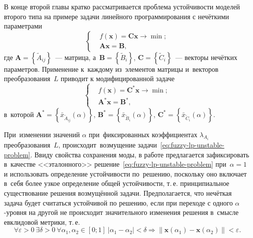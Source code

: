 В конце второй главы кратко рассматривается проблема устойчивости моделей второго типа на примере задачи линейного программирования с нечёткими параметрами
\begin{equation*}
  \left\{ \begin{aligned}
    & f\left( \mathbf{x} \right)=\mathbf{Cx}\to \min;  \\ 
    & \mathbf{Ax}=\mathbf{B},
  \end{aligned} \right.
\end{equation*}
где $\mathbf{A}=\left\{ \tilde{A}_{ij} \right\}$~--- матрица, а~$\mathbf{B}=\left\{ \tilde{B}_i \right\}$, $\mathbf{C}=\left\{\tilde{C}_i \right\}$~--- векторы нечётких параметров. 
Применение к~каждому из~элементов матрицы и~векторов преобразования~$L$ приводит к модифицированной задаче
\begin{equation}
\label{eq:fuzzy-lp-unstable-problem}
  \left\{ \begin{aligned}
    & f\left( \mathbf{x} \right)={\mathbf{C}^{*}}\mathbf{x}\to \min;  \\ 
    & {\mathbf{A}^{*}}\mathbf{x}={\mathbf{B}}^{*},
  \end{aligned} \right.
\end{equation}
в~которой $\mathbf{A}^{*}=\left\{ \bar{x}_{\tilde{A}_{ij}}\left(\alpha \right) \right\}$, $\mathbf{B}^{*}=\left\{ \bar{x}_{\tilde{B}_i}\left(\alpha \right) \right\}$, $\mathbf{C}^{*}=\left\{ \bar{x}_{\tilde{C}_i}\left(\alpha \right) \right\}$.

При~изменении значений $\alpha$ при~фиксированных коэффициентах $\lambda_{A_i}$ преобразования~$L$, происходит~возмущение задачи~\eqref{eq:fuzzy-lp-unstable-problem}. Ввиду свойства сохранения моды, в работе предлагается зафиксировать в~качестве <<эталонного>> решение~\eqref{eq:fuzzy-lp-unstable-problem} при~$\alpha=1$ и использовать определение устойчивости по~решению, поскольку оно включает в~себя более узкое определение общей устойчивости, т.\,е. принципиальное существование решения возмущённой задачи. Предполагается, что нечёткая задача будет считаться устойчивой по решению, если при переходе с одного $\alpha$-уровня на другой не происходит значительного изменения решения в~смысле евклидовой метрики, т.\,е.
\begin{equation}
\label{eq:fuzzy-solution-stability}
  \forall \varepsilon >0\ \exists \delta >0\ \forall \alpha_1, \alpha_2 \in \left[0; 1\right]\ \left| \alpha_1 -\alpha_2 \right|<\delta \Rightarrow \left\| \mathbf{x}\left( \alpha_1 \right)-\mathbf{x}\left( \alpha_2  \right) \right\|<\varepsilon.
\end{equation}

